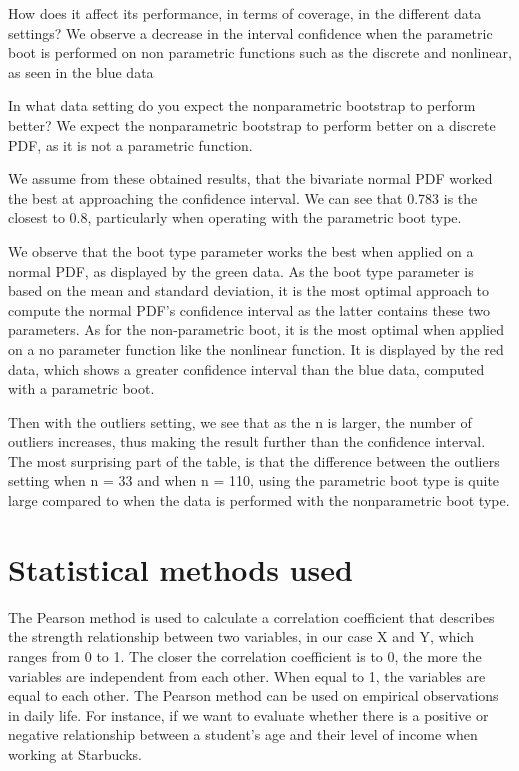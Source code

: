 \documentclass[11pt,]{article}
\begin{document}
How does it affect its performance, in terms of coverage, in the
different data settings? We observe a decrease in the interval
confidence when the parametric boot is performed on non parametric
functions such as the discrete and nonlinear, as seen in the blue data

In what data setting do you expect the nonparametric bootstrap to
perform better? We expect the nonparametric bootstrap to perform better
on a discrete PDF, as it is not a parametric function.

We assume from these obtained results, that the bivariate normal PDF
worked the best at approaching the confidence interval. We can see that
0.783 is the closest to 0.8, particularly when operating with the
parametric boot type.

We observe that the boot type parameter works the best when applied on a
normal PDF, as displayed by the green data. As the boot type parameter
is based on the mean and standard deviation, it is the most optimal
approach to compute the normal PDF's confidence interval as the latter
contains these two parameters. As for the non-parametric boot, it is the
most optimal when applied on a no parameter function like the nonlinear
function. It is displayed by the red data, which shows a greater
confidence interval than the blue data, computed with a parametric boot.

Then with the outliers setting, we see that as the n is larger, the
number of outliers increases, thus making the result further than the
confidence interval. The most surprising part of the table, is that the
difference between the outliers setting when n = 33 and when n = 110,
using the parametric boot type is quite large compared to when the data
is performed with the nonparametric boot type.

\hypertarget{statistical-methods-used}{%
\section{Statistical methods used}\label{statistical-methods-used}}

The Pearson method is used to calculate a correlation coefficient that
describes the strength relationship between two variables, in our case X
and Y, which ranges from 0 to 1. The closer the correlation coefficient
is to 0, the more the variables are independent from each other. When
equal to 1, the variables are equal to each other. The Pearson method
can be used on empirical observations in daily life. For instance, if we
want to evaluate whether there is a positive or negative relationship
between a student's age and their level of income when working at
Starbucks.
\end{document}
